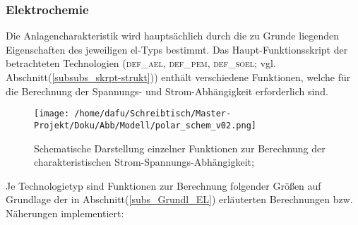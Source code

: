 \documentclass[onecolumn,10pt,titlepage]{article}
\begin{document}



\subsubsection{Elektrochemie}
\label{subsubs_mod_elchem}


Die Anlagencharakteristik wird hauptsächlich durch die zu Grunde liegenden Eigenschaften des jeweiligen \gls{el}-Typs bestimmt.
Das Haupt-Funktionsskript der betrachteten Technologien   (\textsc{def\_ael}, \textsc{def\_pem}, \textsc{def\_soel}; vgl. Abschnitt(\ref{subsubs_skrpt-strukt})) enthält verschiedene Funktionen, welche für die Berechnung der Spannungs- und Strom-Abhängigkeit erforderlich sind.\\
\begin{figure}[H]

	\centering
	\texttt{[image: /home/dafu/Schreibtisch/Master-Projekt/Doku/Abb/Modell/polar\_schem\_v02.png]}
	\caption[Schematische Darstellung zur Berechnung Strom-Spannungs-Abhängigkeit]{Schematische Darstellung einzelner Funktionen zur Berechnung der charakteristischen Strom-Spannungs-Abhängigkeit; }
	\label{fig:schem_polar}
\end{figure}
%
Je Technologietyp sind Funktionen zur Berechnung folgender Größen auf Grundlage der in  Abschnitt(\ref{subs_Grundl_EL}) erläuterten Berechnungen bzw. Näherungen implementiert:\\
\end{document}
